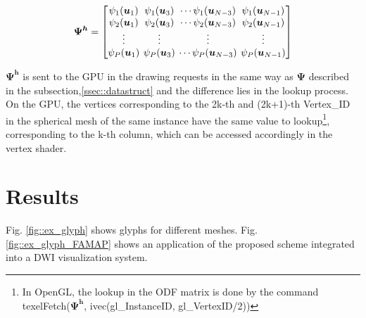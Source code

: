 \documentclass[twoside,twocolumn,10pt]{article}
\begin{document}
\begin{equation*}
\label{eq::Psi_changed}
\bm{\Psi^h} = 
\begingroup %
\setlength\arraycolsep{2pt}
\begin{bmatrix} 
    \psi_1(\bm{u}_1) & \psi_1(\bm{u}_3) & \cdots \psi_1(\bm{u}_{N-3}) & \psi_1(\bm{u}_{N-1})  \\
    
     \psi_2(\bm{u}_1)& \psi_2(\bm{u}_3) & \cdots \psi_2(\bm{u}_{N-3}) & \psi_2(\bm{u}_{N-1}) \\

    \vdots & \vdots & \vdots & \vdots  \\
    
     \psi_P(\bm{u}_1)&\psi_P(\bm{u}_3) & \cdots \psi_P(\bm{u}_{N-3}) & \psi_P(\bm{u}_{N-1})
    
\end{bmatrix}
\endgroup
\end{equation*}

$\bm{\Psi^h}$ is sent to the GPU in the drawing requests in the same way as $\bm{\Psi}$ described in the subsection,\ref{ssec::datastruct} and the difference lies in the lookup process. On the GPU, the vertices corresponding to the 2k-th and (2k+1)-th Vertex\_ID in the spherical mesh of the same instance have the same value to lookup\footnote{In OpenGL, the lookup in the ODF matrix is done by the command texelFetch($\bm{\Psi^h}$, ivec(gl\_InstanceID, gl\_VertexID/2))}, corresponding to the k-th column, which can be accessed accordingly in the vertex shader.




\section{Results}
\label{sec::results}
Fig. \ref{fig::ex_glyph} shows glyphs for different meshes. Fig. \ref{fig::ex_glyph_FAMAP} shows an application of the proposed scheme integrated into a DWI visualization system.
\end{document}
